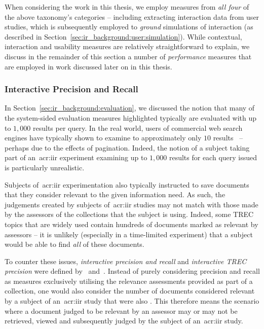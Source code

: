 When considering the work in this thesis, we employ measures from \emph{all four} of the above taxonomy's categories -- including extracting interaction data from user studies, which is subsequently employed to \emph{ground} simulations of interaction (as described in Section~\ref{sec:ir_background:user:simulation}). While contextual, interaction and usability measures are relatively straightforward to explain, we discuss in the remainder of this section a number of \emph{performance} measures that are employed in work discussed later on in this thesis.

\subsubsection{Interactive Precision and Recall}\label{sec:ir_background:user:evaluation:interactive_pr}
In Section~\ref{sec:ir_background:evaluation}, we discussed the notion that many of the system-sided evaluation measures highlighted typically are evaluated with up to $1,000$ results per query. In the real world, users of commercial web search engines have typically shown to examine to approximately only $10$ results~\citep{jansen2006www} -- perhaps due to the effects of pagination. Indeed, the notion of a subject taking part of an~\gls{acr:iir} experiment examining up to $1,000$ results for each query issued is particularly unrealistic.

Subjects of~\gls{acr:iir} experimentation also typically instructed to save documents that they consider relevant to the given information need. As such, the judgements created by subjects of~\gls{acr:iir} studies may not match with those made by the assessors of the collections that the subject is using. Indeed, some TREC topics that are widely used contain hundreds of documents marked as relevant by assessors -- it is unlikely (especially in a time-limited experiment) that a subject would be able to find \emph{all} of these documents.

To counter these issues, \emph{interactive precision and recall} and \emph{interactive TREC precision} were defined by~\cite{veerasamy1996iir} and~\cite{veerasamy1997graphical_display}. Instead of purely considering precision and recall as measures exclusively utilising the relevance assessments provided as part of a collection, one would also consider the number of documents considered relevant by a subject of an~\gls{acr:iir} study that were also . This therefore means the scenario where a document judged to be relevant by an assessor may or may not be retrieved, viewed and subsequently judged by the subject of an~\gls{acr:iir} study.

